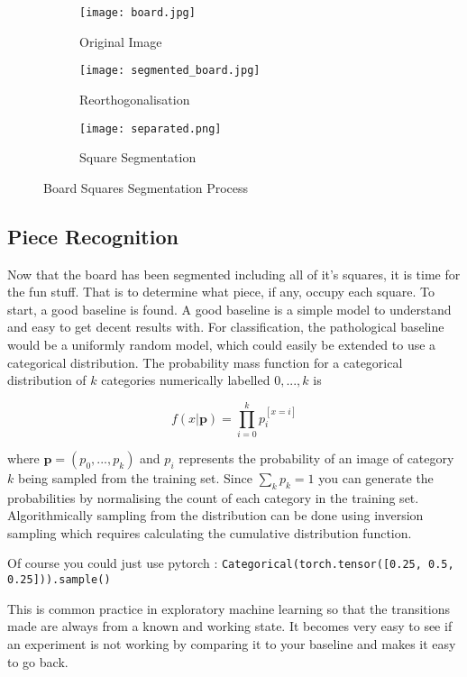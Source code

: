 \begin{figure}[h]
    \centering
    \begin{subfigure}[b]{0.32\textwidth}
        \centering
        \texttt{[image: board.jpg]}
        \caption{Original Image}
    \end{subfigure}
    \hfill
    \begin{subfigure}[b]{0.32\textwidth}
        \centering
        \texttt{[image: segmented\_board.jpg]}
        \caption{Reorthogonalisation}
    \end{subfigure}
    \hfill
    \begin{subfigure}[b]{0.32\textwidth}
        \centering
        \texttt{[image: separated.png]}
        \caption{Square Segmentation}
    \end{subfigure}
\caption{Board Squares Segmentation Process}
\label{fig:corner}
\end{figure}
    

\subsection{Piece Recognition}
Now that the board has been segmented including all of it's squares, it is time for the fun stuff.  That is
to determine what piece, if any, occupy each square.  To start, a good baseline is found.  
A good baseline is a simple model to understand and easy to get decent results with.
For classification, the pathological baseline would be a uniformly random model, which could easily be extended to use a categorical distribution.
The probability mass function for a categorical distribution of $k$ categories numerically labelled $0, ..., k$ is

$$ f(x | \bm{p}) = \prod\limits_{i=0}^{k}{p_i^{[x=i]}} $$

where $\bm{p} = (p_0, ..., p_k)$ and $p_i$ represents the probability of an image of category $k$ being sampled from the training set.
Since $\sum_{k}{p_k} = 1$ you can generate the probabilities by normalising the count of each category in the training set.  Algorithmically 
sampling from the distribution can be done using inversion sampling which requires calculating the cumulative distribution function.

Of course you could just use pytorch \cite{}: \verb|Categorical(torch.tensor([0.25, 0.5, 0.25])).sample()|

This is common practice in exploratory machine learning \cite{} so that the transitions
made are always from a known and working state.  It becomes very easy to see if an experiment is not working by comparing it to your baseline and 
makes it easy to go back.

